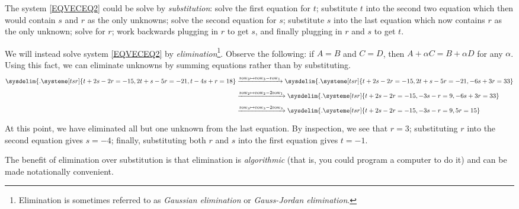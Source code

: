 	The system \eqref{EQVECEQ2} could be solve by \emph{substitution}:
	solve the first equation for $t$; substitute $t$ into the second two equation
	which then would contain $s$ and $r$ as the only unknowns; solve the second
	equation for $s$; substitute $s$ into the last equation which now contains
	$r$ as the only unknown; solve for $r$; work backwards plugging in $r$ to get $s$,
	and finally plugging in $r$ and $s$ to get $t$.

	We will instead solve system \eqref{EQVECEQ2} by \emph{elimination}\footnote{
	Elimination is sometimes referred to as \emph{Gaussian elimination}
	or \emph{Gauss-Jordan elimination}.}.  Observe the following: if $A=B$ and
	$C=D$, then $A+ \alpha C=B+\alpha D$ for any $\alpha$.
	Using this fact, we can eliminate unknowns by summing equations rather than by
	substituting.
	\begin{align*}
	\sysdelim\{.
		\systeme[tsr]{
			t+2s-2r=-15,
			2t+s-5r=-21,
			t-4s+r=18
		}
		&\xrightarrow{\text{row}_3\mapsto\text{row}_3-\text{row}_1}
	\sysdelim\{.
		\systeme[tsr]{
			t+2s-2r=-15,
			2t+s-5r=-21,
			-6s+3r=33
		}\\[4pt]
		&\xrightarrow{\text{row}_2\mapsto\text{row}_2-2\text{row}_1}
	\sysdelim\{.
		\systeme[tsr]{
			t+2s-2r=-15,
			-3s-r=9,
			-6s+3r=33
		}\\[4pt]
		&\xrightarrow{\text{row}_3\mapsto\text{row}_3-2\text{row}_3}
	\sysdelim\{.
		\systeme[tsr]{
			t+2s-2r=-15,
			-3s-r=9,
			  5r=15
		}\\[4pt]
	\end{align*}
	At this point, we have eliminated all but one unknown from
	the last equation. By inspection, we see that $r=3$; substituting 
	$r$ into the second equation gives $s=-4$; finally, substituting both
	$r$ and $s$ into the first equation gives $t=-1$.

	The benefit of elimination over substitution is that elimination
	is \emph{algorithmic} (that is, you could program a computer to do it)
	and can be made notationally convenient.

